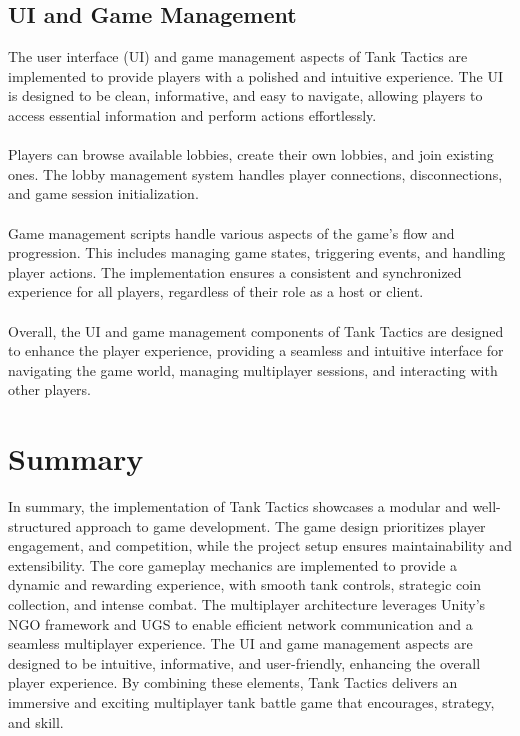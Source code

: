 \subsection{UI and Game Management}
The user interface (UI) and game management aspects of Tank Tactics are implemented to provide players with a polished and intuitive experience. The UI is designed to be clean, informative, and easy to navigate, allowing players to access essential information and perform actions effortlessly.
\\
\noindent
\\
Players can browse available lobbies, create their own lobbies, and join existing ones. The lobby management system handles player connections, disconnections, and game session initialization.
\\
\noindent
\\
Game management scripts handle various aspects of the game's flow and progression. This includes managing game states, triggering events, and handling player actions. The implementation ensures a consistent and synchronized experience for all players, regardless of their role as a host or client.
\\
\noindent
\\
Overall, the UI and game management components of Tank Tactics are designed to enhance the player experience, providing a seamless and intuitive interface for navigating the game world, managing multiplayer sessions, and interacting with other players.


\section{Summary}
In summary, the implementation of Tank Tactics showcases a modular and well-structured approach to game development. The game design prioritizes player engagement, and competition, while the project setup ensures maintainability and extensibility. The core gameplay mechanics are implemented to provide a dynamic and rewarding experience, with smooth tank controls, strategic coin collection, and intense combat. The multiplayer architecture leverages Unity's NGO framework and UGS to enable efficient network communication and a seamless multiplayer experience. The UI and game management aspects are designed to be intuitive, informative, and user-friendly, enhancing the overall player experience. By combining these elements, Tank Tactics delivers an immersive and exciting multiplayer tank battle game that encourages, strategy, and skill.


